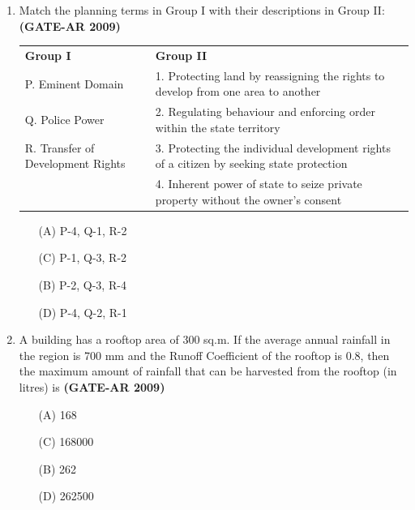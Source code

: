 \documentclass[a4paper,10pt]{article}
\begin{document}
\begin{enumerate}
    \item Match the planning terms in Group I with their descriptions in Group II: \hfill \textbf{(GATE-AR 2009)} \\
    \begin{tabular}{ p p }
	\textbf{Group I} & \textbf{Group II} \\
	P. Eminent Domain & 1. Protecting land by reassigning the rights to develop from one area to another \\
	Q. Police Power & 2. Regulating behaviour and enforcing order within the state territory \\
	R. Transfer of Development Rights & 3. Protecting the individual development rights of a citizen by seeking state protection \\
	& 4. Inherent power of state to seize private property without the owner’s consent \\
	\end{tabular}
	\begin{multicols}{2}
	\begin{itemize}
        \item[(A)] P-4, Q-1, R-2
        \item[(C)] P-1, Q-3, R-2
        \item[(B)] P-2, Q-3, R-4
        \item[(D)] P-4, Q-2, R-1
    \end{itemize}
	\end{multicols}

    \item A building has a rooftop area of 300 sq.m. If the average annual rainfall in the region is 700 mm and the Runoff Coefficient of the rooftop is 0.8, then the maximum amount of rainfall that can be harvested from the rooftop (in litres) is \hfill \textbf{(GATE-AR 2009)}
    \begin{multicols}{2}
	\begin{itemize}
        \item[(A)] 168
        \item[(C)] 168000
        \item[(B)] 262
        \item[(D)] 262500
    \end{itemize}
	\end{multicols}


\end{enumerate}
\end{document}
